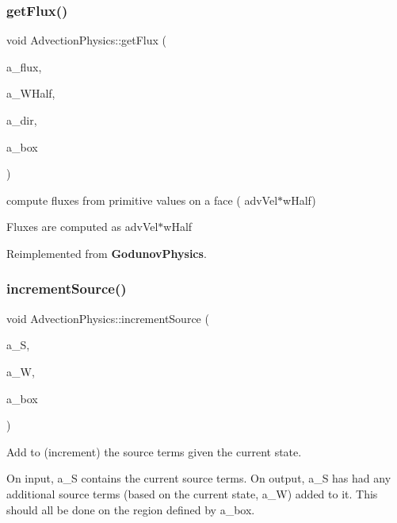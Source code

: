 \subsubsection{\texorpdfstring{get\+Flux()}{getFlux()}}
{\footnotesize\ttfamily void Advection\+Physics\+::get\+Flux (\begin{DoxyParamCaption}\item[{\textbf{ F\+Array\+Box} \&}]{a\+\_\+flux,  }\item[{const \textbf{ F\+Array\+Box} \&}]{a\+\_\+\+W\+Half,  }\item[{const int \&}]{a\+\_\+dir,  }\item[{const \textbf{ Box} \&}]{a\+\_\+box }\end{DoxyParamCaption})\hspace{0.3cm}{\ttfamily [virtual]}}



compute fluxes from primitive values on a face ( adv\+Vel$\ast$w\+Half) 

Fluxes are computed as adv\+Vel$\ast$w\+Half 

Reimplemented from \textbf{ Godunov\+Physics}.

\mbox{\label{class_advection_physics_a4fdd807a85bd6a9d1542a4d1745a4bf7}} 
\subsubsection{\texorpdfstring{increment\+Source()}{incrementSource()}}
{\footnotesize\ttfamily void Advection\+Physics\+::increment\+Source (\begin{DoxyParamCaption}\item[{\textbf{ F\+Array\+Box} \&}]{a\+\_\+S,  }\item[{const \textbf{ F\+Array\+Box} \&}]{a\+\_\+W,  }\item[{const \textbf{ Box} \&}]{a\+\_\+box }\end{DoxyParamCaption})\hspace{0.3cm}{\ttfamily [virtual]}}



Add to (increment) the source terms given the current state. 

On input, a\+\_\+S contains the current source terms. On output, a\+\_\+S has had any additional source terms (based on the current state, a\+\_\+W) added to it. This should all be done on the region defined by a\+\_\+box. 

